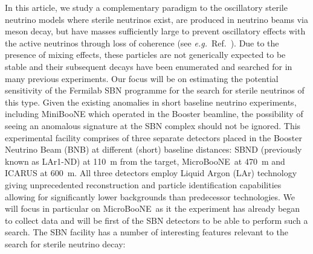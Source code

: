 \documentclass[11pt, a4paper]{article}
\newcommand{\refref}[1]{Ref.~\cite{#1}}
\def\eg{\emph{e.g.}}
\def\muboone{MicroBooNE}
\begin{document}
In this article, we study a complementary paradigm to the oscillatory sterile
neutrino models where sterile neutrinos exist, are produced in neutrino beams
via meson decay, but have masses sufficiently large to prevent oscillatory
effects with the active neutrinos through loss of coherence (see \eg\
\refref{Akhmedov:2009rb}).  Due to the presence of mixing effects, these
particles are not generically expected to be stable and their subsequent decays
have been enumerated \cite{Atre:2009rg} and searched for in many previous
experiments.
%
Our focus will be on estimating the potential sensitivity of the Fermilab SBN
programme \cite{Antonello:2015lea} for the search for sterile neutrinos of this
type. Given the existing anomalies in short baseline neutrino experiments, including
MiniBooNE which operated in the Booster beamline, the possibility of seeing an
anomalous signature at the SBN complex should not be ignored.
%
This experimental facility comprises of three separate detectors placed in the
Booster Neutrino Beam (BNB) at different (short) baseline distances: SBND
(previously known as LAr1-ND) at 110~m from the target, \muboone\ at 470~m and
ICARUS at 600~m.  All three detectors employ Liquid Argon (LAr) technology
giving unprecedented reconstruction and particle identification capabilities
allowing for significantly lower backgrounds than predecessor technologies. We
will focus in particular on \muboone\ as it the experiment has already began
to collect data and will be first of the SBN detectors to be able to perform
such a search.
%
The SBN facility has a number of interesting features relevant to the search
for sterile neutrino decay:
\end{document}
